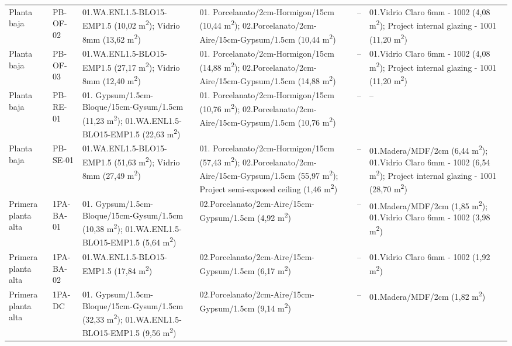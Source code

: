 {\begin{longtable}{p{2.1cm}p{1.6cm}p{3.3cm}p{3.1cm}p{2.5cm}p{2.7cm}}
  Planta baja & PB-OF-02 & 01.WA.ENL1.5-BLO15-EMP1.5 (10,02 m\textsuperscript{2}); Vidrio 8mm (13,62 m\textsuperscript{2}) & 01. Porcelanato/2cm-Hormigon/15cm (10,44 m\textsuperscript{2}); 02.Porcelanato/2cm-Aire/15cm-Gypsum/1.5cm (10,44 m\textsuperscript{2}) & -- & 01.Vidrio Claro 6mm - 1002 (4,08 m\textsuperscript{2}); Project internal glazing - 1001 (11,20 m\textsuperscript{2}) \\
  Planta baja & PB-OF-03 & 01.WA.ENL1.5-BLO15-EMP1.5 (27,17 m\textsuperscript{2}); Vidrio 8mm (12,40 m\textsuperscript{2}) & 01. Porcelanato/2cm-Hormigon/15cm (14,88 m\textsuperscript{2}); 02.Porcelanato/2cm-Aire/15cm-Gypsum/1.5cm (14,88 m\textsuperscript{2}) & -- & 01.Vidrio Claro 6mm - 1002 (4,08 m\textsuperscript{2}); Project internal glazing - 1001 (11,20 m\textsuperscript{2}) \\
  Planta baja & PB-RE-01 & 01. Gypsum/1.5cm-Bloque/15cm-Gysum/1.5cm (11,23 m\textsuperscript{2}); 01.WA.ENL1.5-BLO15-EMP1.5 (22,63 m\textsuperscript{2}) & 01. Porcelanato/2cm-Hormigon/15cm (10,76 m\textsuperscript{2}); 02.Porcelanato/2cm-Aire/15cm-Gypsum/1.5cm (10,76 m\textsuperscript{2}) & -- & -- \\
  Planta baja & PB-SE-01 & 01.WA.ENL1.5-BLO15-EMP1.5 (51,63 m\textsuperscript{2}); Vidrio 8mm (27,49 m\textsuperscript{2}) & 01. Porcelanato/2cm-Hormigon/15cm (57,43 m\textsuperscript{2}); 02.Porcelanato/2cm-Aire/15cm-Gypsum/1.5cm (55,97 m\textsuperscript{2}); Project semi-exposed ceiling (1,46 m\textsuperscript{2}) & -- & 01.Madera/MDF/2cm (6,44 m\textsuperscript{2}); 01.Vidrio Claro 6mm - 1002 (6,54 m\textsuperscript{2}); Project internal glazing - 1001 (28,70 m\textsuperscript{2}) \\
  Primera planta alta & 1PA-BA-01 & 01. Gypsum/1.5cm-Bloque/15cm-Gysum/1.5cm (10,38 m\textsuperscript{2}); 01.WA.ENL1.5-BLO15-EMP1.5 (5,64 m\textsuperscript{2}) & 02.Porcelanato/2cm-Aire/15cm-Gypsum/1.5cm (4,92 m\textsuperscript{2}) & -- & 01.Madera/MDF/2cm (1,85 m\textsuperscript{2}); 01.Vidrio Claro 6mm - 1002 (3,98 m\textsuperscript{2}) \\
  Primera planta alta & 1PA-BA-02 & 01.WA.ENL1.5-BLO15-EMP1.5 (17,84 m\textsuperscript{2}) & 02.Porcelanato/2cm-Aire/15cm-Gypsum/1.5cm (6,17 m\textsuperscript{2}) & -- & 01.Vidrio Claro 6mm - 1002 (1,92 m\textsuperscript{2}) \\
  Primera planta alta & 1PA-DC & 01. Gypsum/1.5cm-Bloque/15cm-Gysum/1.5cm (32,33 m\textsuperscript{2}); 01.WA.ENL1.5-BLO15-EMP1.5 (9,56 m\textsuperscript{2}) & 02.Porcelanato/2cm-Aire/15cm-Gypsum/1.5cm (9,14 m\textsuperscript{2}) & -- & 01.Madera/MDF/2cm (1,82 m\textsuperscript{2}) \\

\end{longtable}}
